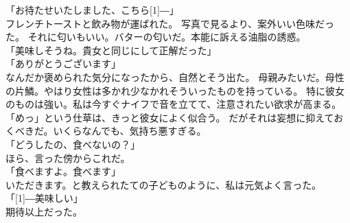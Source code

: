 \documentclass[../HiganMain]{subfiles}
\begin{document}
「お待たせいたしました、こちら\scalebox{3}[1]{―}」\\
フレンチトーストと飲み物が運ばれた。
写真で見るより、案外いい色味だった。
それに匂いもいい。バターの匂いだ。本能に訴える油脂の誘惑。\\
「美味しそうね。貴女と同じにして正解だった」\\
「ありがとうございます」\\
なんだか褒められた気分になったから、自然とそう出た。
母親みたいだ。母性の片鱗。やはり女性は多かれ少なかれそういったものを持っている。
特に彼女のものは強い。私は今すぐナイフで音を立てて、注意されたい欲求が高まる。
「めっ」という仕草は、きっと彼女によく似合う。
だがそれは妄想に抑えておくべきだ。いくらなんでも、気持ち悪すぎる。\\
「どうしたの、食べないの？」\\
ほら、言った傍からこれだ。\\
「食べますよ。食べます」\\
いただきます。と教えられたての子どものように、私は元気よく言った。\\
「\scalebox{3}[1]{―}美味しい」\\
期待以上だった。\\
\end{document}
